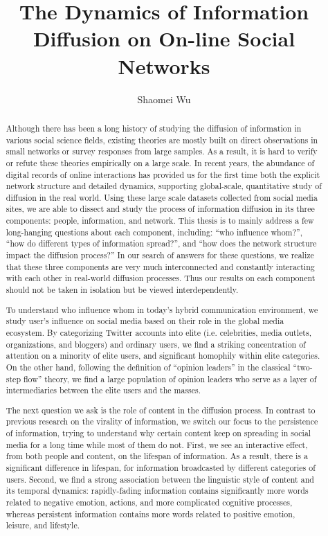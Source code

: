 \documentclass[phd,tocprelim]{cornell}
\title {The Dynamics of Information Diffusion on On-line Social Networks}
\author {Shaomei Wu}
\begin{document}
\maketitle
\makecopyright

\begin{abstract}
Although there has been a long history of studying the diffusion of information in various social science fields, existing theories are mostly built on direct observations in small networks or survey responses from large samples. As a result, it is hard to verify or refute these theories empirically on a large scale. In recent years, the abundance of digital records of online interactions has provided us for the first time both the explicit network structure and detailed dynamics, supporting global-scale, quantitative study of diffusion in the real world. Using these large scale datasets collected from social media sites, we are able to dissect and study the process of information diffusion in its three components: people, information, and network.
This thesis is to mainly address a few long-hanging questions about each component, including: ``who influence whom?'',  ``how do different types of information spread?'',  and ``how does the network structure impact the diffusion process?'' In our search of answers for these questions, we realize that these three components are very much interconnected and constantly interacting with each other in real-world diffusion processes. Thus our results on each component should not be taken in isolation but be viewed interdependently. 

To understand who influence whom in today's hybrid communication environment, we study user's influence on social media based on their role in the global media ecosystem. By categorizing Twitter accounts into elite (i.e. celebrities, media outlets, organizations, and bloggers) and ordinary users, we find a striking concentration of attention on a minority of elite users, and significant homophily within elite categories. On the other hand, following the definition of ``opinion leaders'' in the classical ``two-step flow'' theory, we find a large population of opinion leaders who serve as a layer of intermediaries between the elite users and the masses. 

The next question we ask is the role of content in the diffusion process. In contrast to previous research on the virality of information, we switch our focus to the persistence of information, trying to understand why certain content keep on spreading in social media for a long time while most of them do not. First, we see an interactive effect, from both people and content, on the lifespan of information. As a result, there is a significant difference in lifespan, for information broadcasted by different categories of users. Second, we find a strong association between the linguistic style of content and its temporal dynamics: rapidly-fading information contains significantly more words related to negative emotion, actions, and more complicated cognitive processes, whereas persistent information contains more words related to positive emotion, leisure, and lifestyle.
 

\end{abstract}
\end{document}
